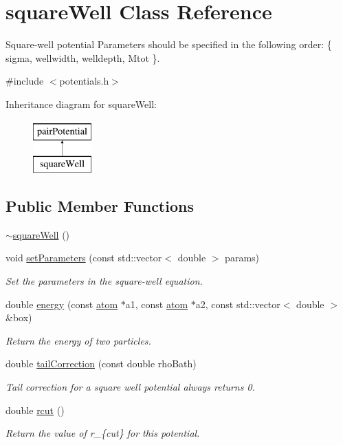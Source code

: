 \hypertarget{classsquare_well}{\section{square\-Well Class Reference}
\label{classsquare_well}
}


Square-\/well potential Parameters should be specified in the following order\-: \{ sigma, wellwidth, welldepth, Mtot \}.  




{\ttfamily \#include $<$potentials.\-h$>$}

Inheritance diagram for square\-Well\-:\begin{figure}[H]
\begin{center}
\leavevmode
\includegraphics[height=2.000000cm]{classsquare_well}
\end{center}
\end{figure}
\subsection*{Public Member Functions}
\begin{DoxyCompactItemize}
\item 
\hyperlink{classsquare_well_aee8080c488f394e2157648849e0e4b43}{$\sim$square\-Well} ()
\item 
void \hyperlink{classsquare_well_aa8770429044914778c2f343e025e09cc}{set\-Parameters} (const std\-::vector$<$ double $>$ params)
\begin{DoxyCompactList}\small\item\em Set the parameters in the square-\/well equation. \end{DoxyCompactList}\item 
double \hyperlink{classsquare_well_af91d33913dd2ac3ce84e2cf18530f75d}{energy} (const \hyperlink{classatom}{atom} $\ast$a1, const \hyperlink{classatom}{atom} $\ast$a2, const std\-::vector$<$ double $>$ \&box)
\begin{DoxyCompactList}\small\item\em Return the energy of two particles. \end{DoxyCompactList}\item 
double \hyperlink{classsquare_well_a3a81297ea3a06f8a354c824a7ac5dc94}{tail\-Correction} (const double rho\-Bath)
\begin{DoxyCompactList}\small\item\em Tail correction for a square well potential always returns 0. \end{DoxyCompactList}\item 
double \hyperlink{classsquare_well_a82e1cc1009bd8e42e79e3c5f856f1b3b}{rcut} ()
\begin{DoxyCompactList}\small\item\em Return the value of r\-\_\-\{cut\} for this potential. \end{DoxyCompactList}\end{DoxyCompactItemize}
